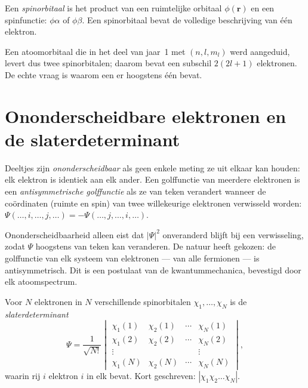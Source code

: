 \begin{definition}[Spinorbitaal]\label{def:b3:many-electron-atoms:spin-orbital}
Een \emph{spinorbitaal} is het product van een
ruimtelijke orbitaal
$\phi(\mathbf r)$ en een spinfunctie: $\phi\alpha$ of $\phi\beta$. Een
spinorbitaal bevat de volledige beschrijving van één elektron.
\end{definition}

Een atoomorbitaal die in het deel van jaar~1 met $(n, l, m_l)$ werd
aangeduid, levert dus twee
spinorbitalen; daarom bevat een subschil $2(2l+1)$ elektronen. De echte
vraag is waarom een  er hoogstens één bevat.

\section{Ononderscheidbare elektronen en de slaterdeterminant}

\begin{definition}\label{def:b3:many-electron-atoms:indistinguishable}
Deeltjes zijn \emph{ononderscheidbaar} als
geen enkele meting ze uit elkaar kan houden: elk elektron is identiek aan
elk ander. Een golffunctie van meerdere elektronen is een
\emph{antisymmetrische golffunctie} als
ze van teken verandert wanneer de
coördinaten (ruimte en spin) van twee willekeurige elektronen verwisseld
worden:
$\Psi(\dots,i,\dots,j,\dots) = -\Psi(\dots,j,\dots,i,\dots)$.
\end{definition}

Ononderscheidbaarheid alleen eist dat $|\Psi|^2$ onveranderd blijft bij
een verwisseling, zodat $\Psi$ hoogstens van teken kan veranderen. De
natuur heeft gekozen: de
golffunctie van elk systeem van elektronen --- van alle fermionen --- is
antisymmetrisch. Dit is een postulaat van de kwantummechanica, bevestigd
door elk atoomspectrum.

\begin{definition}[Slaterdeterminant]\label{def:b3:many-electron-atoms:slater}
Voor $N$ elektronen in $N$ verschillende spinorbitalen $\chi_1, \dots, \chi_N$ is de
\emph{slaterdeterminant}
\[
\Psi = \frac{1}{\sqrt{N!}}\begin{vmatrix}
\chi_1(1) & \chi_2(1) & \cdots & \chi_N(1)\\
\chi_1(2) & \chi_2(2) & \cdots & \chi_N(2)\\
\vdots & & & \vdots\\
\chi_1(N) & \chi_2(N) & \cdots & \chi_N(N)
\end{vmatrix},
\]
waarin rij $i$ elektron $i$ in elk  bevat. Kort geschreven:
$|\chi_1\chi_2\dots\chi_N|$.
\end{definition}


